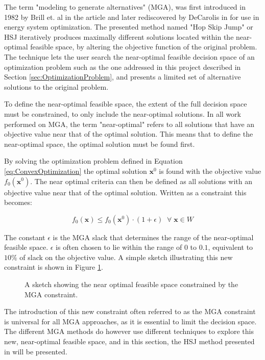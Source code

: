 The term "modeling to generate alternatives" (MGA), was first introduced in 1982 by Brill et. al in the article \cite{Brill_MGA_1982} and later rediscovered by DeCarolis in \cite{DeCarolis_MGA} for use in energy system optimization. The presented method named "Hop Skip Jump" or HSJ iteratively produces maximally different solutions located within the near-optimal feasible space, by altering the objective function of the original problem. The technique lets the user search the near-optimal feasible decision space of an optimization problem such as the one addressed in this project described in Section \ref{sec:OptimizationProblem}, and presents a limited set of alternative solutions to the original problem. 

To define the near-optimal feasible space, the extent of the full decision space must be constrained, to only include the near-optimal solutions. In all work performed on MGA, the term "near-optimal" refers to all solutions that have an objective value near that of the optimal solution. This means that to define the near-optimal space, the optimal solution must be found first. 

By solving the optimization problem defined in Equation \ref{eq:ConvexOptimization} the optimal solution $\mathbf{x}^0 $ is found  with the objective value $ f_0(\mathbf{x}^0 ) $. The near optimal criteria can then be defined as all solutions with an objective value near that of the optimal solution. Written as a constraint this becomes: 

\begin{equation}\label{eq:MGA_constraint1}
f_0(\mathbf{x}) \leq f_0(\mathbf{x}^0)  \cdot (1+\epsilon) \; \; \forall \;  \mathbf{x}\in W
\end{equation}

The constant $ \epsilon $ is the MGA slack that determines the range of the near-optimal feasible space. $ \epsilon $ is often chosen to lie within the range of $0$ to $0.1$, equivalent to $10\%$ of slack on the objective value. A simple sketch illustrating this new constraint is shown in Figure \ref{fig:sketch_feasable_space}.

\begin{figure}[h]
	\caption{A sketch showing the near optimal feasible space constrained by the MGA constraint.}
	\label{fig:sketch_feasable_space}    
\end{figure}

The introduction of this new constraint often referred to as the MGA constraint is universal for all MGA approaches, as it is essential to limit the decision space. The different MGA methods do however use different techniques to explore this new, near-optimal feasible space, and in this section, the HSJ method presented in \cite{Brill_MGA_1982} will be presented.  

